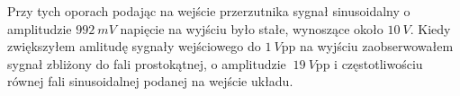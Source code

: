 \documentclass[14pt, table]{extarticle}
\begin{document}
\begin{figure}[H]
    \centering
    \qquad
\end{figure}

\newpage
Przy tych oporach podając na wejście przerzutnika sygnał sinusoidalny o amplitudzie $992 \ mV$ napięcie na wyjściu było stałe, wynoszące około $10 \ V$. Kiedy zwiększyłem amlitudę sygnały wejściowego do $ 1 \ V$pp na wyjściu zaobserwowałem sygnał zbliżony do fali prostokątnej, o amplitudzie $~19 \ V$pp i częstotliwościu równej fali sinusoidalnej podanej na wejście układu.
\begin{figure}[H]
    \centering
    \qquad
\end{figure}
\end{document}
